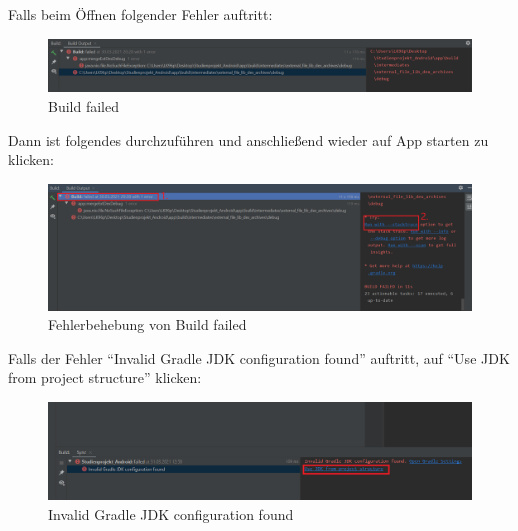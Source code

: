 \documentclass[12pt, onecolumn, notitlepage]{scrartcl}
\begin{document}
Falls beim Öffnen folgender Fehler auftritt:
\begin{figure}[H]
\includegraphics[width=1\textwidth]{build_Fehler.PNG}
\caption{Build failed}
\end{figure}
Dann ist folgendes durchzuführen und anschließend wieder auf App starten zu klicken:
\begin{figure}[H]
\includegraphics[width=1\textwidth]{build_Klick.PNG}
\caption{Fehlerbehebung von Build failed}
\end{figure}
Falls der Fehler \enquote{Invalid Gradle JDK configuration found} auftritt, auf \enquote{Use JDK from project structure} klicken:
\begin{figure}[H]
	\includegraphics[width=1\textwidth]{invalid_gradle.png}
	\caption{Invalid Gradle JDK configuration found}
\end{figure}
\end{document}
